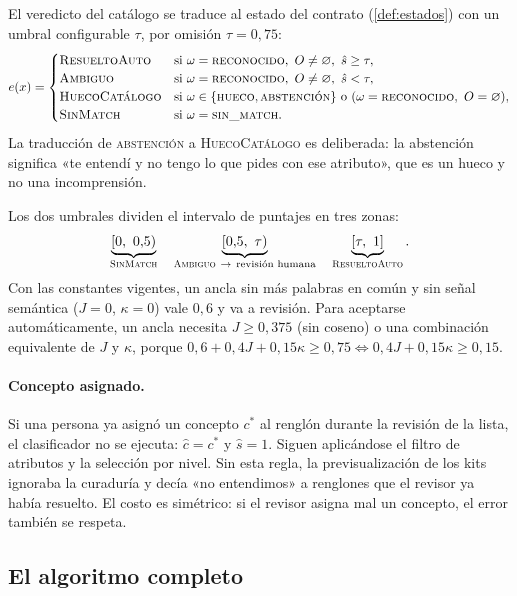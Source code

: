 El veredicto del catálogo se traduce al estado del contrato
(\cref{def:estados}) con un umbral configurable $\tau$, por omisión
$\tau=0{,}75$:
\[
  e(x)=\begin{cases}
    \textsc{ResueltoAuto} & \text{si } \omega=\textsc{reconocido},\ O\neq\varnothing,\ \hat s\geq\tau,\\
    \textsc{Ambiguo} & \text{si } \omega=\textsc{reconocido},\ O\neq\varnothing,\ \hat s<\tau,\\
    \textsc{HuecoCatálogo} & \text{si } \omega\in\{\textsc{hueco},\textsc{abstención}\}
      \text{ o } (\omega=\textsc{reconocido},\ O=\varnothing),\\
    \textsc{SinMatch} & \text{si } \omega=\textsc{sin\_match}.
  \end{cases}
\]
La traducción de \textsc{abstención} a \textsc{HuecoCatálogo} es deliberada:
la abstención significa «te entendí y no tengo lo que pides con ese
atributo», que es un hueco y no una incomprensión.

Los dos umbrales dividen el intervalo de puntajes en tres zonas:
\[
  \underbrace{[0,\ 0{,}5)}_{\textsc{SinMatch}}
  \quad
  \underbrace{[0{,}5,\ \tau)}_{\textsc{Ambiguo}\ \to\ \text{revisión humana}}
  \quad
  \underbrace{[\tau,\ 1]}_{\textsc{ResueltoAuto}}.
\]
Con las constantes vigentes, un ancla sin más palabras en común y sin señal
semántica ($J=0$, $\kappa=0$) vale $0{,}6$ y va a revisión. Para aceptarse
automáticamente, un ancla necesita $J\geq0{,}375$ (sin coseno) o una
combinación equivalente de $J$ y $\kappa$, porque
$0{,}6+0{,}4J+0{,}15\kappa\geq0{,}75\iff 0{,}4J+0{,}15\kappa\geq0{,}15$.

\paragraph{Concepto asignado.} Si una persona ya asignó un concepto $c^\ast$ al
renglón durante la revisión de la lista, el clasificador no se ejecuta:
$\hat c=c^\ast$ y $\hat s=1$. Siguen aplicándose el filtro de atributos y la
selección por nivel. Sin esta regla, la previsualización de los kits ignoraba
la curaduría y decía «no entendimos» a renglones que el revisor ya había
resuelto. El costo es simétrico: si el revisor asigna mal un concepto, el
error también se respeta.

\subsection{El algoritmo completo}
\label{sec:res-algoritmo}

